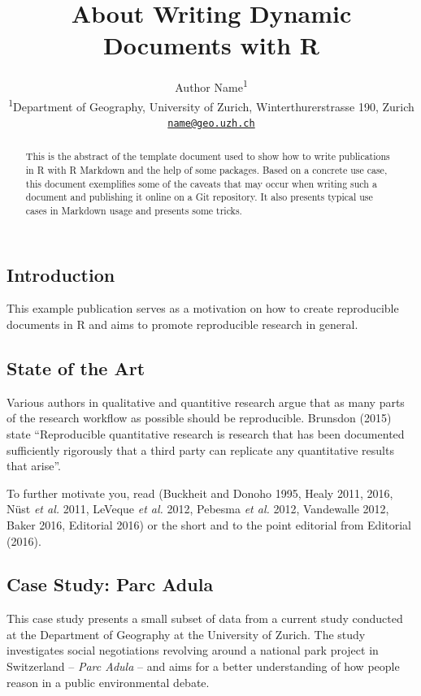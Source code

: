 \documentclass[]{article}
\title{About Writing Dynamic Documents with R}
\author{Author Name\textsuperscript{1} \\ \textsuperscript{1}Department of Geography, University of Zurich,
Winterthurerstrasse 190, Zurich \\ \href{mailto:name@geo.uzh.ch}{\nolinkurl{name@geo.uzh.ch}}}
\date{}
\begin{document}
\maketitle
\begin{abstract}
This is the abstract of the template document used to show how to write
publications in R with R Markdown and the help of some packages. Based
on a concrete use case, this document exemplifies some of the caveats
that may occur when writing such a document and publishing it online on
a Git repository. It also presents typical use cases in Markdown usage
and presents some tricks.
\end{abstract}

\subsection{Introduction}\label{introduction}

This example publication serves as a motivation on how to create
reproducible documents in R and aims to promote reproducible research in
general.

\subsection{State of the Art}\label{state-of-the-art}

Various authors in qualitative and quantitive research argue that as
many parts of the research workflow as possible should be reproducible.
Brunsdon (2015) state ``Reproducible quantitative research is research
that has been documented sufficiently rigorously that a third party can
replicate any quantitative results that arise''.

To further motivate you, read (Buckheit and Donoho 1995, Healy 2011,
2016, Nüst \emph{et al.} 2011, LeVeque \emph{et al.} 2012, Pebesma
\emph{et al.} 2012, Vandewalle 2012, Baker 2016, Editorial 2016) or the
short and to the point editorial from Editorial (2016).

\subsection{Case Study: Parc Adula}\label{case-study-parc-adula}

This case study presents a small subset of data from a current study
conducted at the Department of Geography at the University of Zurich.
The study investigates social negotiations revolving around a national
park project in Switzerland -- \emph{Parc Adula} -- and aims for a
better understanding of how people reason in a public environmental
debate.
\end{document}
